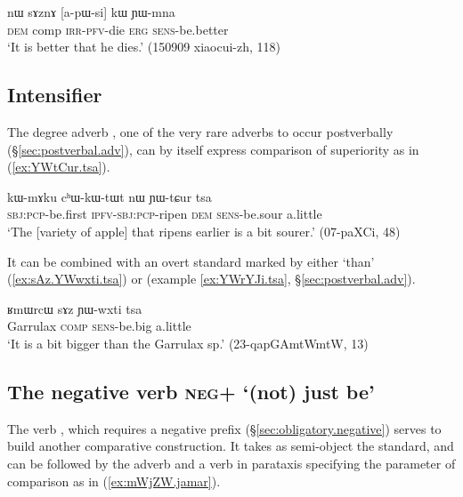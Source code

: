 \begin{exe}
\ex \label{ex:apWsi.kW}
\gll nɯ sɤznɤ [a-pɯ-si] kɯ ɲɯ-mna \\
\textsc{dem} comp \textsc{irr}-\textsc{pfv}-die \textsc{erg} \textsc{sens}-be.better \\
\glt `It is better that he dies.' (150909 xiaocui-zh, 118)
\end{exe}

\subsection{Intensifier    } \label{sec:comparative.tsa}
The degree adverb , one of the very rare adverbs to occur postverbally (§\ref{sec:postverbal.adv}), can by itself express comparison of superiority as in (\ref{ex:YWtCur.tsa}).

\begin{exe}
\ex \label{ex:YWtCur.tsa}
\gll  kɯ-mɤku cʰɯ-kɯ-tɯt nɯ ɲɯ-tɕur tsa \\
\textsc{sbj}:\textsc{pcp}-be.first \textsc{ipfv}-\textsc{sbj}:\textsc{pcp}-ripen \textsc{dem} \textsc{sens}-be.sour a.little\\
\glt `The [variety of apple] that ripens earlier is a bit sourer.' (07-paXCi, 48)
\end{exe}

It can be combined with an overt standard marked by either  `than' (\ref{ex:sAz.YWwxti.tsa}) or  (example \ref{ex:YWrYJi.tsa}, §\ref{sec:postverbal.adv}).

\begin{exe}
\ex \label{ex:sAz.YWwxti.tsa}
\gll  ʁmɯrcɯ sɤz ɲɯ-wxti tsa \\
Garrulax \textsc{comp} \textsc{sens}-be.big a.little \\
\glt `It is a bit bigger than the Garrulax sp.' (23-qapGAmtWmtW, 13)
\end{exe}

\subsection{The negative verb \textsc{neg}+ `(not) just be'} \label{sec:mAZW}
The verb , which requires a negative prefix (§\ref{sec:obligatory.negative}) serves to build another comparative construction. It takes as semi-object the standard, and can be followed by the adverb  and a verb in parataxis specifying the parameter of comparison as in (\ref{ex:mWjZW.jamar}).

